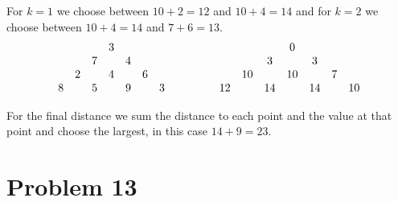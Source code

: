 \documentclass[oneside,12pt]{book}   	%
\theoremstyle{definition}
\begin{document}
\begin{spacing}{1.618}
			For $k=1$ we choose between $10+2=12$ and $10+4=14$ and for $k=2$ we choose between $10+4=14$ and $7+6=13$. 
			\begin{alignat}{4}
				\begin{array}{ccccccc}
					&&&{3}&&& \\
					&&{7}&& 4&& \\
					&2&&{4}&& 6& \\
					8 && 5 && {9} && 3
				\end{array} &\hspace{1 cm}&\begin{array}{ccccccc}
					&&& 0 \\
					&& 3 && 3\\
					& 10 & &10 & & 7 \\
					12 &&14&&14& &10 
				\end{array}
			\end{alignat}

			For the final distance we sum the distance to each point and the value at that point and choose the largest, in this case $14+9=23$. 
		
\appendix

	\chapter{Problem 13}\label{A:P:13}
	

\end{spacing}
\end{document}
